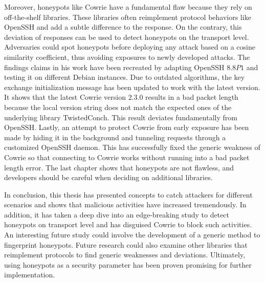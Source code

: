 Moreover, honeypots like Cowrie have a fundamental flaw because they rely on off-the-shelf libraries.
These libraries often reimplement protocol behaviors like OpenSSH and add a subtle difference to the response.
On the contrary, this deviation of responses can be used to detect honeypots on the transport level.
Adversaries could spot honeypots before deploying any attack based on a cosine similarity coefficient, thus avoiding exposures to newly developed attacks.
The findings \citet{vetterl2020} claims in his work have been recreated by adapting OpenSSH $8.8P1$ and testing it on different Debian instances.
Due to outdated algorithms, the key exchange initialization message has been updated to work with the latest version.
It shows that the latest Cowrie version $2.3.0$ results in a bad packet length because the local version string does not match the expected ones of the underlying library TwistedConch.
This result deviates fundamentally from OpenSSH.
Lastly, an attempt to protect Cowrie from early exposure has been made by hiding it in the background and tunneling requests through a customized OpenSSH daemon.
This has successfully fixed the generic weakness of Cowrie so that connecting to Cowrie works without running into a bad packet length error.
The last chapter shows that honeypots are not flawless, and developers should be careful when deciding on additional libraries.

In conclusion, this thesis has presented concepts to catch attackers for different scenarios and shows that malicious activities have increased tremendously.
In addition, it has taken a deep dive into an edge-breaking study to detect honeypots on transport level and has disguised Cowrie to block such activities.
An interesting future study could involve the development of a generic method to fingerprint honeypots.
Future research could also examine other libraries that reimplement protocols to find generic weaknesses and deviations.
Ultimately, using honeypots as a security parameter has been proven promising for further implementation.
